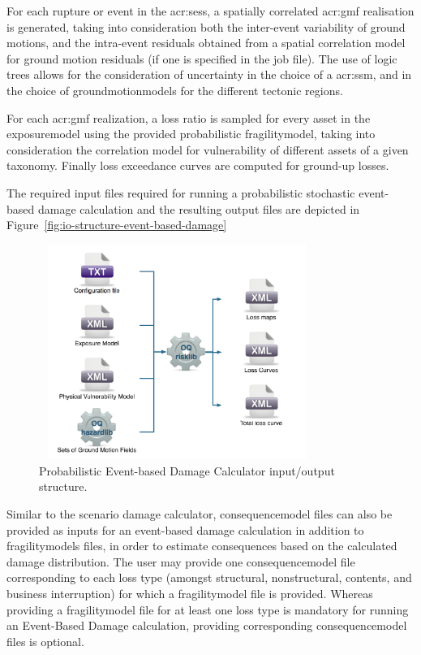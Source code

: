 For each \gls{rupture} or event in the \glspl{acr:ses}, a spatially correlated
\gls{acr:gmf} realisation is generated, taking into consideration both the
inter-event variability of ground motions, and the intra-event residuals
obtained from a spatial correlation model for ground motion residuals (if one 
is specified in the job file). The use of logic trees allows for the 
consideration of uncertainty in the choice of a \glsdesc{acr:ssm}, and in the 
choice of \glspl{groundmotionmodel} for the different tectonic regions.

For each \gls{acr:gmf} realization, a loss ratio is sampled for every
\gls{asset} in the \gls{exposuremodel} using the provided probabilistic
\gls{fragilitymodel}, taking into consideration the correlation model for
vulnerability of different \glspl{asset} of a given taxonomy. Finally loss
exceedance curves are computed for ground-up losses.

The required input files required for running a probabilistic stochastic
event-based damage calculation and the resulting output files are depicted in
Figure~\ref{fig:io-structure-event-based-damage}

\begin{figure}[ht]
\centering
\includegraphics[width=9cm,height=7cm]{figures/risk/io-structure-event-based-risk.pdf}
\caption{Probabilistic Event-based Damage Calculator input/output structure.}
\label{fig:io-structure-event-based-risk}
\end{figure}

Similar to the scenario damage calculator, \gls{consequencemodel} files can also be
provided as inputs for an event-based damage calculation in addition to
\glspl{fragilitymodel} files, in order to estimate consequences based on the
calculated damage distribution. The user may provide one
\gls{consequencemodel} file corresponding to each loss type (amongst
structural, nonstructural, contents, and business interruption) for which a
\gls{fragilitymodel} file is provided. Whereas providing a
\gls{fragilitymodel} file for at least one loss type is mandatory for running
an Event-Based Damage calculation, providing corresponding \gls{consequencemodel}
files is optional.
